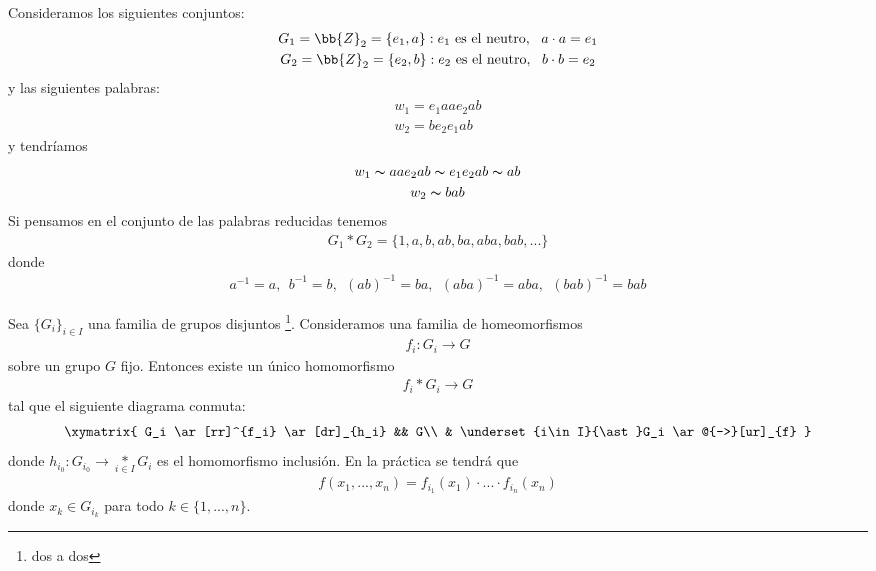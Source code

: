\begin{ejemplo}
    Consideramos los siguientes conjuntos:
    \begin{gather*}
        G_1 = \bb{Z}_2 = \{e_1, a\}: e_1 \text{ es el neutro},\ \ a\cdot a = e_1\\
        G_2 = \bb{Z}_2 = \{e_2, b\}: e_2 \text{ es el neutro},\ \ b\cdot b = e_2
    \end{gather*}
    y las siguientes palabras:
    \begin{gather*}
        w_1 = e_1aae_2ab\\
        w_2=be_2e_1ab
    \end{gather*}
    y tendríamos 
    \begin{gather*}
        w_1 \thicksim aae_2ab \thicksim e_1e_2ab \thicksim ab\\
        w_2 \thicksim bab
    \end{gather*}
    Si pensamos en el conjunto de las palabras reducidas tenemos 
    \begin{gather*}
        G_1 \ast G_2 = \{1, a, b, ab, ba, aba, bab, ...\}
    \end{gather*}
    donde 
    \begin{gather*}
        a^{-1} = a,\ \ b^{-1}=b,\ \ (ab)^{-1}=ba,\ \ (aba)^{-1}=aba,\ \ (bab)^{-1} = bab
    \end{gather*}
\end{ejemplo}

\begin{lema}
    Sea $\{G_i\}_{i\in I}$ una familia de grupos disjuntos \footnote{dos a dos}. Consideramos una familia de homeomorfismos
    \begin{gather*}
        f_i: G_i \to G
    \end{gather*}
    sobre un grupo $G$ fijo. Entonces existe un único homomorfismo
    \begin{gather*}
        f_i \ast G_i \to G
    \end{gather*}
    tal que el siguiente diagrama conmuta:
    \begin{gather*}    
        \xymatrix{ %
            G_i \ar[rr]^{f_i} \ar[dr]_{h_i} && G\\
            & \underset{i\in I}{\ast}G_i \ar@{-->}[ur]_{f}
        }
    \end{gather*}
    donde $h_{i_0}:G_{i_0}\to \underset{i\in I}{\ast} G_i$ es el homomorfismo inclusión. En la práctica se tendrá que 
    \begin{gather*}
        f(x_1,...,x_n) = f_{i_1}(x_1) \cdot ... \cdot f_{i_n}(x_n)
    \end{gather*}
    donde $x_k \in G_{i_k}$ para todo $k\in \{1,...,n\}$.
\end{lema}

